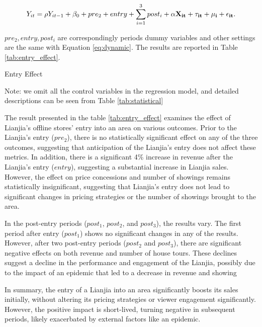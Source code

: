 \documentclass[12pt]{article}
\begin{document}
\begin{equation}
    Y_{it} = \rho Y_{it-1} + \beta_0 +  pre_2 + entry + \sum_{i=1}^3 post_i + \bf{\alpha} \bf{X}_{it} + \tau_{it} + \mu_i + \epsilon_{it}.   \label{eq:entry_effect}
\end{equation}

$pre_2, entry, post_i$ are correspondingly periods dummy variables and other settings are the same with Equation \eqref{eq:dynamic}. The results are reported in Table \ref{tab:entry_effect}.

\begin{table}[htb!]
  \begin{center}
    \begin{scriptsize}
    \caption{Entry Effect}
    \label{tab:entry_effect}
      
    
    Note: we omit all the control variables in the regression model, and detailed descriptions can be seen from Table \ref{tab:statistical}
    \end{scriptsize}
  \end{center}
\end{table}

The result presented in the table \ref{tab:entry_effect} examines the effect of Lianjia's offline stores' entry into an area on various outcomes. Prior to the Lianjia's entry ($pre_2$), there is no statistically significant effect on any of the three outcomes, suggesting that anticipation of the Lianjia's entry does not affect these metrics. In addition, there is a significant 4\% increase in revenue after the Lianjia's entry ($entry$), suggesting a substantial increase in Lianjia sales. However, the effect on price concessions and number of showings remains statistically insignificant, suggesting that Lianjia's entry does not lead to significant changes in pricing strategies or the number of showings brought to the area.

In the post-entry periods ($post_1$, $post_2$, and $post_3$), the results vary. The first period after entry ($post_1$) shows no significant changes in any of the results. However, after two post-entry periods ($post_2$ and $post_3$), there are significant negative effects on both revenue and number of house tours. These declines suggest a decline in the performance and engagement of the Lianjia, possibly due to the impact of an epidemic that led to a decrease in revenue and showing

In summary, the entry of a Lianjia into an area significantly boosts its sales initially, without altering its pricing strategies or viewer engagement significantly. However, the positive impact is short-lived, turning negative in subsequent periods, likely exacerbated by external factors like an epidemic.
\end{document}
